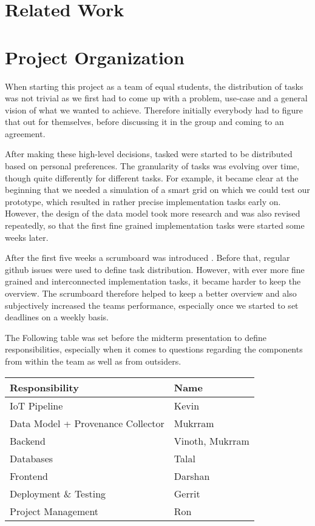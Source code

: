 \section{Related Work}




\section{Project Organization}

When starting this project as a team of equal students, the distribution of tasks was not trivial as we first had to come up with a problem, use-case and a general vision of what we wanted to achieve. 
Therefore initially everybody had to figure that out for themselves, before discussing it in the group and coming to an agreement.

After making these high-level decisions, tasked were started to be distributed based on personal preferences. 
The granularity of tasks was evolving over time, though quite differently for different tasks.
For example, it became clear at the beginning that we needed a simulation of a smart grid on which we could test our prototype, which resulted in rather precise implementation tasks early on. 
However, the design of the data model took more research and was also revised repeatedly, so that the first fine grained implementation tasks were started some weeks later.

After the first five weeks a scrumboard was introduced \cite{zenhub}. 
Before that, regular github issues were used to define task distribution. 
However, with ever more fine grained and interconnected implementation tasks, it became harder to keep the overview. 
The scrumboard therefore helped to keep a better overview and also subjectively increased the teams performance, especially once we started to set deadlines on a weekly basis.

The Following table was set before the midterm presentation to define responsibilities, especially when it comes to questions regarding the components from within the team as well as from outsiders.


\renewcommand{\arraystretch}{1.4}
\begin{center}
 \begin{tabular}{| m{18em} m{10em} |} 
 \hline
 Responsibility & Name  \\
 \hline\hline
 IoT Pipeline & Kevin \\ 
 \hline
Data Model + Provenance Collector & Mukrram \\
 \hline
 Backend & Vinoth, Mukrram \\
 \hline
 Databases & Talal \\
 \hline
 Frontend & Darshan \\ 
 \hline
 Deployment \& Testing & Gerrit \\
 \hline
Project Management & Ron \\
 \hline
\end{tabular}
\end{center}


